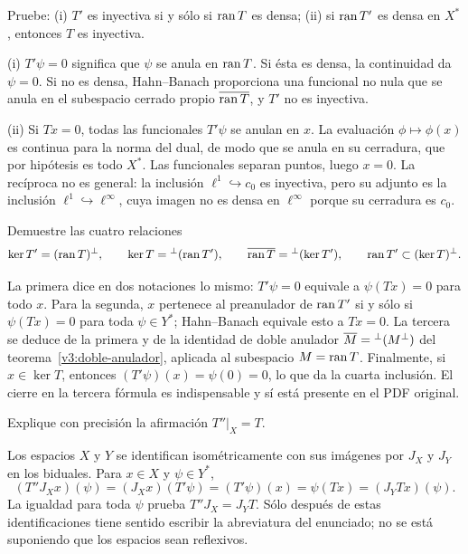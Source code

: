 \begin{ejercicio}\label{ej:v3-l04-5}
Pruebe: (i) $T'$ es inyectiva si y sólo si $\operatorname{ran} T$ es densa; (ii) si $\operatorname{ran} T'$ es densa en $X^*$, entonces $T$ es inyectiva.
\end{ejercicio}
\begin{solucion}
(i) $T'\psi=0$ significa que $\psi$ se anula en $\operatorname{ran} T$. Si ésta es densa, la continuidad da $\psi=0$. Si no es densa, Hahn--Banach proporciona una funcional no nula que se anula en el subespacio cerrado propio $\overline{\operatorname{ran} T}$, y $T'$ no es inyectiva.

(ii) Si $Tx=0$, todas las funcionales $T'\psi$ se anulan en $x$. La evaluación $\phi\mapsto\phi(x)$ es continua para la norma del dual, de modo que se anula en su cerradura, que por hipótesis es todo $X^*$. Las funcionales separan puntos, luego $x=0$. La recíproca no es general: la inclusión $\ell^1\hookrightarrow c_0$ es inyectiva, pero su adjunto es la inclusión $\ell^1\hookrightarrow\ell^\infty$, cuya imagen no es densa en $\ell^\infty$ porque su cerradura es $c_0$.
\end{solucion}

\begin{ejercicio}\label{ej:v3-l04-6}
Demuestre las cuatro relaciones
\[\ker T'=(\operatorname{ran} T)^\perp,\qquad \ker T={}^\perp(\operatorname{ran} T'),\qquad
\overline{\operatorname{ran} T}={}^\perp(\ker T'),\qquad \operatorname{ran} T'\subset(\ker T)^\perp.
\]
\end{ejercicio}
\begin{solucion}
La primera dice en dos notaciones lo mismo: $T'\psi=0$ equivale a $\psi(Tx)=0$ para todo $x$. Para la segunda, $x$ pertenece al preanulador de $\operatorname{ran} T'$ si y sólo si $\psi(Tx)=0$ para toda $\psi\in Y^*$; Hahn--Banach equivale esto a $Tx=0$. La tercera se deduce de la primera y de la identidad de doble anulador $\overline{M}={}^\perp(M^\perp)$ del teorema~\ref{v3:doble-anulador}, aplicada al subespacio $M=\operatorname{ran} T$. Finalmente, si $x\in\ker T$, entonces $(T'\psi)(x)=\psi(0)=0$, lo que da la cuarta inclusión. El cierre en la tercera fórmula es indispensable y sí está presente en el PDF original.
\end{solucion}

\begin{ejercicio}\label{ej:v3-l04-7}
Explique con precisión la afirmación $T''|_X=T$.
\end{ejercicio}
\begin{solucion}
Los espacios $X$ y $Y$ se identifican isométricamente con sus imágenes por $J_X$ y $J_Y$ en los biduales. Para $x\in X$ y $\psi\in Y^*$,
\[(T''J_Xx)(\psi)=(J_Xx)(T'\psi)=(T'\psi)(x)=\psi(Tx)=(J_YTx)(\psi).
\]
La igualdad para toda $\psi$ prueba $T''J_X=J_YT$. Sólo después de estas identificaciones tiene sentido escribir la abreviatura del enunciado; no se está suponiendo que los espacios sean reflexivos.
\end{solucion}

